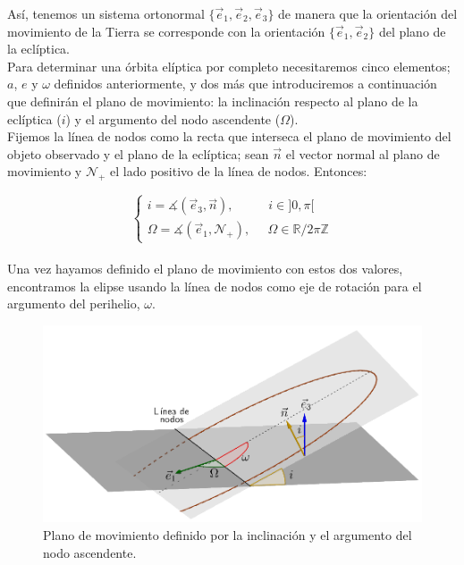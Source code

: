 \documentclass[11pt]{article}
\begin{document}
Así, tenemos un sistema ortonormal $\{\vec{e}_1,\vec{e}_2,\vec{e}_3\}$ de manera que la orientación del movimiento de la Tierra se corresponde con la orientación $\{\vec{e}_1,\vec{e}_2\}$ del plano de la eclíptica.\\

Para determinar una órbita elíptica por completo necesitaremos cinco elementos; $a$, $e$ y $\omega$ definidos anteriormente, y dos más que introduciremos a continuación que definirán el plano de movimiento: la inclinación respecto al plano de la eclíptica ($i$) y el argumento del nodo ascendente ($\Omega$).\\

Fijemos la línea de nodos como la recta que interseca el plano de movimiento del objeto observado y el plano de la eclíptica; sean $\vec{n}$ el vector normal al plano de movimiento y $\mathcal{N}_+$ el lado positivo de la línea de nodos. Entonces:

\[
\left\{
\begin{array}{l}
	i=\measuredangle(\vec{e}_3,\vec{n}), \; \; \; \; \; \; \; \; \; \; i\in]0,\pi[\\
	\Omega=\measuredangle(\vec{e}_1, \mathcal{N}_+), \; \; \; \; \; \Omega\in\mathbb{R}/2\pi\mathbb{Z}
\end{array}
\right.
\]\\

Una vez hayamos definido el plano de movimiento con estos dos valores, encontramos la elipse usando la línea de nodos como eje de rotación para el argumento del perihelio, $\omega$.

\begin{figure}[H]
\centering
\includegraphics[scale=0.375]{images/omega_i_5.png}
\caption{Plano de movimiento definido por la inclinación y el argumento del nodo ascendente.}
\label{fig:omega_i}
\end{figure}
\end{document}
